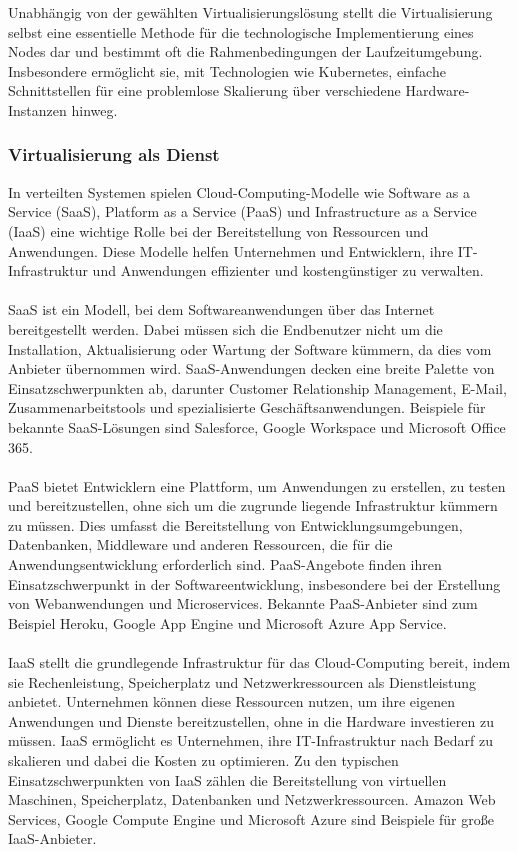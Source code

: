 Unabhängig von der gewählten Virtualisierungslösung stellt die Virtualisierung selbst eine essentielle Methode für die technologische Implementierung eines Nodes dar und bestimmt oft die Rahmenbedingungen der Laufzeitumgebung. Insbesondere ermöglicht sie, mit Technologien wie Kubernetes, einfache Schnittstellen für eine problemlose Skalierung über verschiedene Hardware-Instanzen hinweg.

\subsubsection{Virtualisierung als Dienst}

In verteilten Systemen spielen Cloud-Computing-Modelle wie Software as a Service (SaaS), Platform as a Service (PaaS) und Infrastructure as a Service (IaaS) eine wichtige Rolle bei der Bereitstellung von Ressourcen und Anwendungen. Diese Modelle helfen Unternehmen und Entwicklern, ihre IT-Infrastruktur und Anwendungen effizienter und kostengünstiger zu verwalten.
\\\\
SaaS ist ein Modell, bei dem Softwareanwendungen über das Internet bereitgestellt werden. Dabei müssen sich die Endbenutzer nicht um die Installation, Aktualisierung oder Wartung der Software kümmern, da dies vom Anbieter übernommen wird. SaaS-Anwendungen decken eine breite Palette von Einsatzschwerpunkten ab, darunter Customer Relationship Management, E-Mail, Zusammenarbeitstools und spezialisierte Geschäftsanwendungen. Beispiele für bekannte SaaS-Lösungen sind Salesforce, Google Workspace und Microsoft Office 365.
\\\\
PaaS bietet Entwicklern eine Plattform, um Anwendungen zu erstellen, zu testen und bereitzustellen, ohne sich um die zugrunde liegende Infrastruktur kümmern zu müssen. Dies umfasst die Bereitstellung von Entwicklungsumgebungen, Datenbanken, Middleware und anderen Ressourcen, die für die Anwendungsentwicklung erforderlich sind. PaaS-Angebote finden ihren Einsatzschwerpunkt in der Softwareentwicklung, insbesondere bei der Erstellung von Webanwendungen und Microservices. Bekannte PaaS-Anbieter sind zum Beispiel Heroku, Google App Engine und Microsoft Azure App Service.
\\\\
IaaS stellt die grundlegende Infrastruktur für das Cloud-Computing bereit, indem sie Rechenleistung, Speicherplatz und Netzwerkressourcen als Dienstleistung anbietet. Unternehmen können diese Ressourcen nutzen, um ihre eigenen Anwendungen und Dienste bereitzustellen, ohne in die Hardware investieren zu müssen. IaaS ermöglicht es Unternehmen, ihre IT-Infrastruktur nach Bedarf zu skalieren und dabei die Kosten zu optimieren. Zu den typischen Einsatzschwerpunkten von IaaS zählen die Bereitstellung von virtuellen Maschinen, Speicherplatz, Datenbanken und Netzwerkressourcen. Amazon Web Services, Google Compute Engine und Microsoft Azure sind Beispiele für große IaaS-Anbieter.
